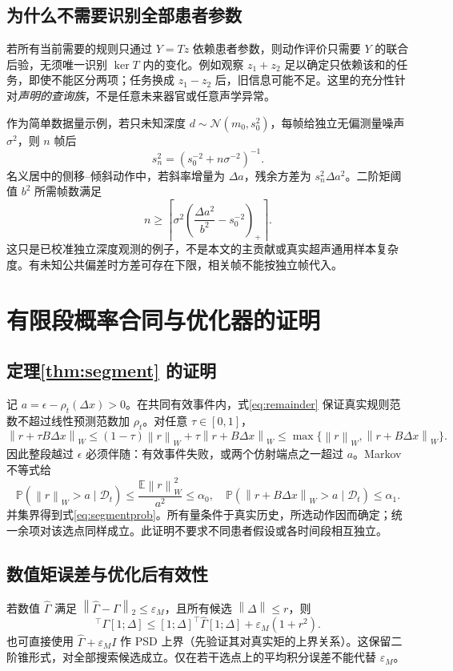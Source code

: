 \documentclass[UTF8,11pt,a4paper,fontset=fandol]{ctexart}
\numberwithin{equation}{section}
\theoremstyle{definition}
\newcommand{\E}{\mathbb E}
\newcommand{\Prob}{\mathbb P}
\newcommand{\D}{\mathcal D}
\newcommand{\N}{\mathcal N}
\newcommand{\norm}[1]{\left\lVert#1\right\rVert}
\begin{document}
\subsection{为什么不需要识别全部患者参数}
若所有当前需要的规则只通过 $Y=Tz$ 依赖患者参数，则动作评价只需要 $Y$ 的联合后验，无须唯一识别 $\ker T$ 内的变化。例如观察 $z_1+z_2$ 足以确定只依赖该和的任务，即使不能区分两项；任务换成 $z_1-z_2$ 后，旧信息可能不足。这里的充分性针对\emph{声明的查询族}，不是任意未来器官或任意声学异常。

作为简单数据量示例，若只未知深度 $d\sim\N(m_0,s_0^2)$，每帧给独立无偏测量噪声 $\sigma^2$，则 $n$ 帧后
\begin{equation}
 s_n^2=(s_0^{-2}+n\sigma^{-2})^{-1}.
 \label{eq:samples}
\end{equation}
名义居中的侧移--倾斜动作中，若斜率增量为 $\Delta a$，残余方差为 $s_n^2\Delta a^2$。二阶矩阈值 $b^2$ 所需帧数满足
\begin{equation}
 n\ge\left\lceil\sigma^2\left(\frac{\Delta a^2}{b^2}-s_0^{-2}\right)_+\right\rceil.
 \label{eq:sampleillustration}
\end{equation}
这只是已校准独立深度观测的例子，不是本文的主贡献或真实超声通用样本复杂度。有未知公共偏差时方差可存在下限，相关帧不能按独立帧代入。

\section{有限段概率合同与优化器的证明}
\label{app:certificate}
\subsection{定理\ref{thm:segment} 的证明}
记 $a=\epsilon-\rho_t(\Delta x)>0$。在共同有效事件内，式\eqref{eq:remainder} 保证真实规则范数不超过线性预测范数加 $\rho_t$。对任意 $\tau\in[0,1]$，
\begin{equation}
 \norm{r+\tau B\Delta x}_W
 \le(1-\tau)\norm r_W+\tau\norm{r+B\Delta x}_W
 \le\max\{\norm r_W,\norm{r+B\Delta x}_W\}.
\end{equation}
因此整段越过 $\epsilon$ 必须伴随：有效事件失败，或两个仿射端点之一超过 $a$。Markov 不等式给
\[
 \Prob(\norm r_W>a\mid\D_t)\le\frac{\E\norm r_W^2}{a^2}\le\alpha_0,
\quad
 \Prob(\norm{r+B\Delta x}_W>a\mid\D_t)\le\alpha_1.
\]
并集界得到式\eqref{eq:segmentprob}。所有量条件于真实历史，所选动作因而确定；统一余项对该选点同样成立。此证明不要求不同患者假设或各时间段相互独立。

\subsection{数值矩误差与优化后有效性}
若数值 $\widehat\Gamma$ 满足 $\norm{\widehat\Gamma-\Gamma}_2\le\varepsilon_M$，且所有候选 $\norm{\Delta}\le r$，则
\begin{equation}
 [1;\Delta]^\top\Gamma[1;\Delta]
 \le[1;\Delta]^\top\widehat\Gamma[1;\Delta]
      +\varepsilon_M(1+r^2).
 \label{eq:momenterror}
\end{equation}
也可直接使用 $\widehat\Gamma+\varepsilon_MI$ 作 PSD 上界（先验证其对真实矩的上界关系）。这保留二阶锥形式，对全部搜索候选成立。仅在若干选点上的平均积分误差不能代替 $\varepsilon_M$。
\end{document}

